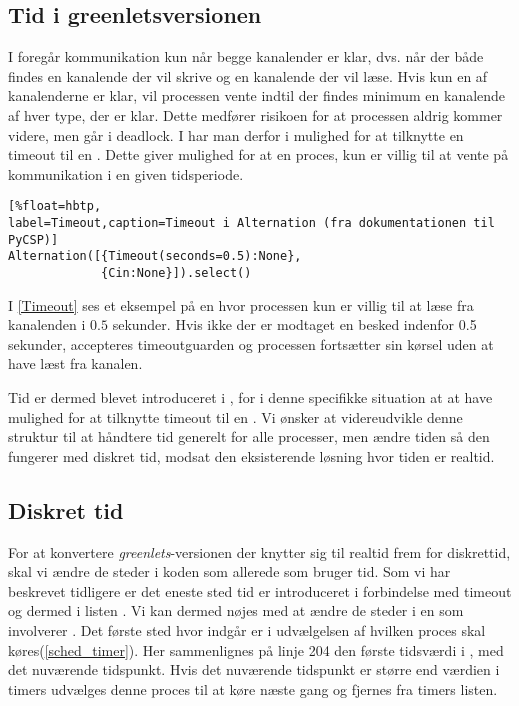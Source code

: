 


\begin{shaded}
\subsection{Tid i greenletsversionen} 
I \pycsp foregår kommunikation
kun når begge kanalender er klar, dvs. når der både findes en
kanalende der vil skrive og en kanalende der vil læse. Hvis
kun en af kanalenderne er klar, vil processen vente indtil der findes
minimum en kanalende af hver type, der er klar. Dette medfører
risikoen for at processen aldrig kommer videre, men går i deadlock.
I \pycsp har man derfor i  mulighed for at
tilknytte en timeout til en . Dette giver mulighed for
at en proces, kun er villig til at vente på kommunikation i en
given tidsperiode. 
\begin{lstlisting}[%float=hbtp, 
label=Timeout,caption=Timeout i Alternation (fra dokumentationen til PyCSP)]
Alternation([{Timeout(seconds=0.5):None}, 
             {Cin:None}]).select()
\end{lstlisting}

I \cref{Timeout} ses et eksempel på en  hvor processen kun er villig
til at læse fra kanalenden  i $0.5$ sekunder. Hvis ikke der
er modtaget en besked indenfor 0.5 sekunder, accepteres timeoutguarden
og processen fortsætter sin kørsel uden at have læst fra kanalen.

Tid er dermed blevet introduceret i \pycsp, for i denne specifikke situation at at have
mulighed for at tilknytte timeout til en . Vi ønsker
at videreudvikle denne struktur til at håndtere tid generelt for alle
processer, men ændre tiden så den fungerer med diskret tid, modsat den eksisterende
løsning hvor tiden er realtid.
\end{shaded}


\subsection{Diskret tid} 
For at konvertere \emph{greenlets}-versionen der knytter sig til realtid frem for diskrettid, skal vi ændre de steder i koden som allerede som bruger tid. Som vi har beskrevet tidligere er det eneste sted tid er introduceret i forbindelse med timeout og dermed i listen . Vi kan dermed nøjes med at ændre de steder i \sched en som involverer . Det første sted hvor  indgår er i udvælgelsen af hvilken proces skal køres(\cref{sched_timer}). Her sammenlignes på linje 204  den første tidsværdi i , med det nuværende tidspunkt. Hvis det nuværende tidspunkt er større end værdien i timers udvælges denne proces til at køre næste gang og fjernes fra timers listen.

